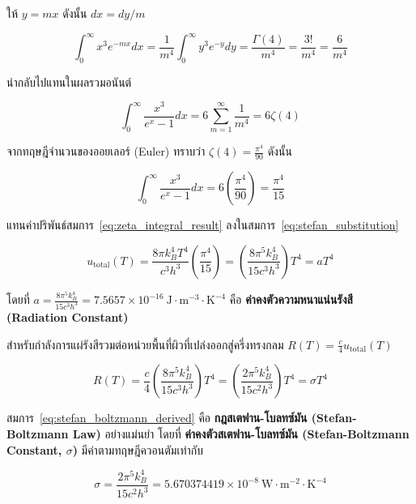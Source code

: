ให้ $y = mx$ ดังนั้น $dx = dy/m$

\begin{equation}
\int_0^\infty x^3 e^{-mx} dx = \frac{1}{m^4} \int_0^\infty y^3 e^{-y} dy = \frac{\Gamma(4)}{m^4} = \frac{3!}{m^4} = \frac{6}{m^4}
\end{equation}

นำกลับไปแทนในผลรวมอนันต์

\begin{equation}
\int_0^\infty \frac{x^3}{e^x - 1} dx = 6 \sum_{m=1}^\infty \frac{1}{m^4} = 6 \zeta(4)
\end{equation}

จากทฤษฎีจำนวนของออยเลอร์ (Euler) ทราบว่า $\zeta(4) = \frac{\pi^4}{90}$ ดังนั้น

\begin{equation}
\int_0^\infty \frac{x^3}{e^x - 1} dx = 6 \left( \frac{\pi^4}{90} \right) = \frac{\pi^4}{15}
\label{eq:zeta_integral_result}
\end{equation}

แทนค่าปริพันธ์สมการ~\eqref{eq:zeta_integral_result} ลงในสมการ~\eqref{eq:stefan_substitution}

\begin{equation}
u_{\text{total}}(T) = \frac{8\pi k_B^4 T^4}{c^3 h^3} \left( \frac{\pi^4}{15} \right) = \left( \frac{8\pi^5 k_B^4}{15 c^3 h^3} \right) T^4 = a T^4
\label{eq:energy_density_T4}
\end{equation}

โดยที่ $a = \frac{8\pi^5 k_B^4}{15 c^3 h^3} = 7.5657 \times 10^{-16}~\text{J}\cdot\text{m}^{-3}\cdot\text{K}^{-4}$ คือ \textbf{ค่าคงตัวความหนาแน่นรังสี (Radiation Constant)}

สำหรับกำลังการแผ่รังสีรวมต่อหน่วยพื้นที่ผิวที่เปล่งออกสู่ครึ่งทรงกลม $R(T) = \frac{c}{4} u_{\text{total}}(T)$

\begin{equation}
R(T) = \frac{c}{4} \left( \frac{8\pi^5 k_B^4}{15 c^3 h^3} \right) T^4 = \left( \frac{2\pi^5 k_B^4}{15 c^2 h^3} \right) T^4 = \sigma T^4
\label{eq:stefan_boltzmann_derived}
\end{equation}

สมการ~\eqref{eq:stefan_boltzmann_derived} คือ \textbf{กฎสเตฟาน-โบลทซ์มัน (Stefan-Boltzmann Law)} อย่างแม่นยำ โดยที่ \textbf{ค่าคงตัวสเตฟาน-โบลทซ์มัน (Stefan-Boltzmann Constant, $\sigma$)} มีค่าตามทฤษฎีควอนตัมเท่ากับ

\begin{equation}
\sigma = \frac{2\pi^5 k_B^4}{15 c^2 h^3} = 5.670374419 \times 10^{-8}~\text{W}\cdot\text{m}^{-2}\cdot\text{K}^{-4}
\label{eq:sigma_value}
\end{equation}

